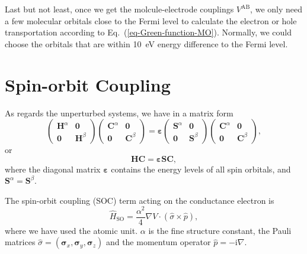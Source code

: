 \documentclass[a4paper,11pt,twoside,openright]{book}
\begin{document}
Last but not least, once we get the molcule-electrode couplings $V^{\text{AB}}$, we only need a few
molecular orbitals close to the Fermi level to calculate the electron or hole transportation according to
Eq.~(\ref{eq-Green-function-MO}). Normally, we could choose the orbitals that are within 10~eV energy
difference to the Fermi level.

\section{Spin-orbit Coupling}
\label{section-ME-SOC}

As regards the unperturbed systems, we have in a matrix form
\begin{equation}
  \begin{pmatrix}
    \mathbf{H}^{\alpha} & \mathbf{0}\\
    \mathbf{0} & \mathbf{H}^{\beta}
  \end{pmatrix}
  \begin{pmatrix}
    \mathbf{C}^{\alpha} & \mathbf{0}\\
    \mathbf{0} & \mathbf{C}^{\beta}
  \end{pmatrix}
  =\boldsymbol{\varepsilon}
  \begin{pmatrix}
    \mathbf{S}^{\alpha} & \mathbf{0}\\
    \mathbf{0} & \mathbf{S}^{\beta}
  \end{pmatrix}
  \begin{pmatrix}
    \mathbf{C}^{\alpha} & \mathbf{0}\\
    \mathbf{0} & \mathbf{C}^{\beta}
  \end{pmatrix},
\end{equation}
or
\begin{equation}
  \mathbf{H}\mathbf{C}=\boldsymbol{\varepsilon}\mathbf{S}\mathbf{C},
\end{equation}
where the diagonal matrix $\boldsymbol{\varepsilon}$ contains the energy levels of all spin orbitals,
and $\mathbf{S}^{\alpha}=\mathbf{S}^{\beta}$.

The spin-orbit coupling (SOC) term acting on the conductance electron is\cite{Guo-PRL108-218102}
\begin{equation}
  \hat{H}_{\text{SO}}=\frac{\alpha^{2}}{4}\nabla V\cdot\left(\hat{\sigma}\times\hat{p}\right),
\end{equation}
where we have used the atomic unit. $\alpha$ is the fine structure constant, the Pauli matrices
$\hat{\sigma}=(\boldsymbol{\sigma}_{x},\boldsymbol{\sigma}_{y},\boldsymbol{\sigma}_{z})$
and the momentum operator $\hat{p}=-\text{i}\nabla$.
\end{document}
